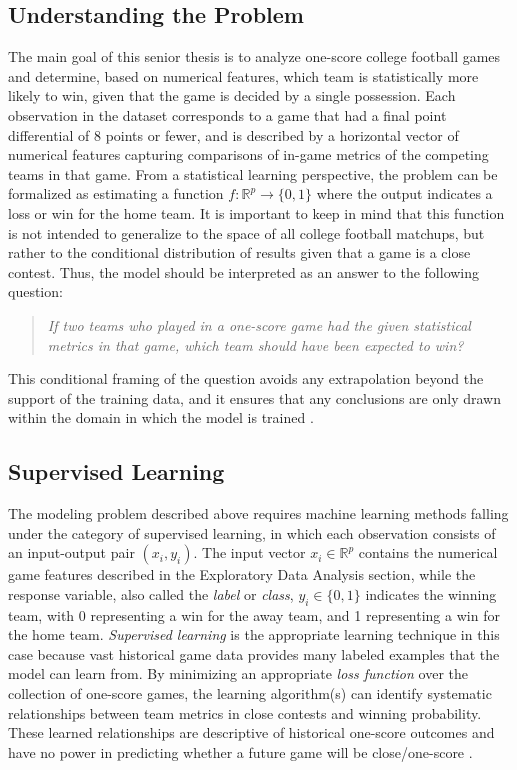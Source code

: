 \documentclass[11pt]{amsart}
\theoremstyle{definition}                  %
\theoremstyle{remark}                       %
\numberwithin{equation}{section}
\newcommand{\R}{\mathbb{R}}
\begin{document}
\subsection{Understanding the Problem}
The main goal of this senior thesis is to analyze one-score college football games and determine, based on numerical features, which team is statistically more likely to win, given that the game is decided by a single possession. Each observation in the dataset corresponds to a game that had a final point differential of 8 points or fewer, and is described by a horizontal vector of numerical features capturing comparisons of in-game metrics of the competing teams in that game. From a statistical learning perspective, the problem can be formalized as estimating a function $f: \R^p \to \{0,1\}$ where the output indicates a loss or win for the home team. It is important to keep in mind that this function is not intended to generalize to the space of all college football matchups, but rather to the conditional distribution of results given that a game is a close contest. Thus, the model should be interpreted as an answer to the following question:
\begin{quote}
    \textit{If two teams who played in a one-score game had the given statistical metrics in that game, which team should have been expected to win? }
\end{quote}
This conditional framing of the question avoids any extrapolation beyond the support of the training data, and it ensures that any conclusions are only drawn within the domain in which the model is trained \cite{hastie2009elements}.

\subsection{Supervised Learning}
The modeling problem described above requires machine learning methods falling under the category of supervised learning, in which each observation consists of an input-output pair $(x_i, y_i)$. The input vector $x_i \in \R^p$ contains the numerical game features described in the Exploratory Data Analysis section, while the response variable, also called the \textit{label} or \textit{class}, $y_i \in \{0, 1\}$ indicates the winning team, with 0 representing a win for the away team, and 1 representing a win for the home team. \textit{Supervised learning} is the appropriate learning technique in this case because vast historical game data provides many labeled examples that the model can learn from. By minimizing an appropriate \textit{loss function} over the collection of one-score games, the learning algorithm(s) can identify systematic relationships between team metrics in close contests and winning probability. These learned relationships are descriptive of historical one-score outcomes and have no power in predicting whether a future game will be close/one-score \cite{bishop2006pattern}.
\end{document}
